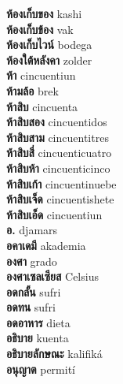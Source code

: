 \textbf{ ห้องเก็บของ  } kashi \\
\textbf{ ห้องเก็บข้อง  } vak \\
\textbf{ ห้องเก็บไวน์  } bodega \\
\textbf{ ห้องใต้หลังคา  } zolder \\
\textbf{ ห้า  } cincuentiun \\
\textbf{ ห้ามล้อ  } brek \\
\textbf{ ห้าสิบ  } cincuenta \\
\textbf{ ห้าสิบสอง  } cincuentidos \\
\textbf{ ห้าสิบสาม  } cincuentitres \\
\textbf{ ห้าสิบสี่  } cincuenticuatro \\
\textbf{ ห้าสิบห้า  } cincuenticinco \\
\textbf{ ห้าสิบเก้า  } cincuentinuebe \\
\textbf{ ห้าสิบเจ็ด  } cincuentishete \\
\textbf{ ห้าสิบเอ็ด  } cincuentiun \\
\textbf{ อ.  } djamars \\
\textbf{ อคาเดมี  } akademia \\
\textbf{ องศา  } grado \\
\textbf{ องศาเซลเซียส  } Celsius \\
\textbf{ อดกลั้น  } sufri \\
\textbf{ อดทน  } sufri \\
\textbf{ อดอาหาร  } dieta \\
\textbf{ อธิบาย  } kuenta \\
\textbf{ อธิบายลักษณะ  } kalifiká \\
\textbf{ อนุญาต  } permití \\
